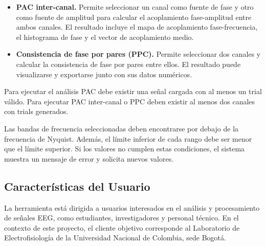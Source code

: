 \documentclass[12pt, letterpaper]{article}
\begin{document}
\begin{itemize}
    El resultado incluye un mapa de acoplamiento fase-frecuencia, un
    histograma de distribución de amplitud en función de la fase y un vector
    de acoplamiento medio con su magnitud y ángulo.

    \item \textbf{PAC inter-canal.} Permite seleccionar un canal como fuente
    de fase y otro como fuente de amplitud para calcular el acoplamiento
    fase-amplitud entre ambos canales. El resultado incluye el mapa de
    acoplamiento fase-frecuencia, el histograma de fase y el vector de
    acoplamiento medio.

    \item \textbf{Consistencia de fase por pares (PPC).} Permite seleccionar dos canales
    y calcular la consistencia de fase por pares entre ellos. El resultado puede
    visualizarse y exportarse junto con sus datos numéricos.

\end{itemize}

Para ejecutar el análisis PAC debe existir una señal cargada con al menos un
trial válido. Para ejecutar PAC inter-canal o PPC deben existir al menos dos
canales con trials generados.

Las bandas de frecuencia seleccionadas deben encontrarse por debajo de la
frecuencia de Nyquist. Además, el límite inferior de cada rango debe ser
menor que el límite superior. Si los valores no cumplen estas condiciones,
el sistema muestra un mensaje de error y solicita nuevos valores.

\subsection{Características del Usuario}

La herramienta está dirigida a usuarios interesados en el análisis y
procesamiento de señales EEG, como estudiantes, investigadores y personal
técnico. En el contexto de este proyecto, el cliente objetivo corresponde al
Laboratorio de Electrofisiología de la Universidad Nacional de Colombia,
sede Bogotá.
\end{document}
